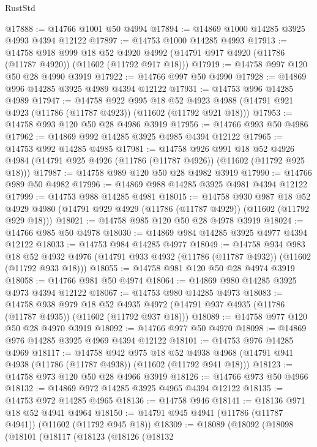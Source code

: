 \begin{lexlean}{RustStd}
\begin{coremodule}
@17888 := @14766 @1001 @50 @4994
@17894 := @14869 @1000 @14285 @3925 @4993 @4394 @12122
@17897 := @14753 @1000 @14285 @4993
@17913 := @14758
    @918
    @999
    @18
    @52
    @4920
    @4992
    (@14791 @917 @4920 (@11786 (@11787 @4920)) (@11602 (@11792 @917 @18)))
@17919 := @14758 @997 @120 @50 @28 @4990 @3919
@17922 := @14766 @997 @50 @4990
@17928 := @14869 @996 @14285 @3925 @4989 @4394 @12122
@17931 := @14753 @996 @14285 @4989
@17947 := @14758
    @922
    @995
    @18
    @52
    @4923
    @4988
    (@14791 @921 @4923 (@11786 (@11787 @4923)) (@11602 (@11792 @921 @18)))
@17953 := @14758 @993 @120 @50 @28 @4986 @3919
@17956 := @14766 @993 @50 @4986
@17962 := @14869 @992 @14285 @3925 @4985 @4394 @12122
@17965 := @14753 @992 @14285 @4985
@17981 := @14758
    @926
    @991
    @18
    @52
    @4926
    @4984
    (@14791 @925 @4926 (@11786 (@11787 @4926)) (@11602 (@11792 @925 @18)))
@17987 := @14758 @989 @120 @50 @28 @4982 @3919
@17990 := @14766 @989 @50 @4982
@17996 := @14869 @988 @14285 @3925 @4981 @4394 @12122
@17999 := @14753 @988 @14285 @4981
@18015 := @14758
    @930
    @987
    @18
    @52
    @4929
    @4980
    (@14791 @929 @4929 (@11786 (@11787 @4929)) (@11602 (@11792 @929 @18)))
@18021 := @14758 @985 @120 @50 @28 @4978 @3919
@18024 := @14766 @985 @50 @4978
@18030 := @14869 @984 @14285 @3925 @4977 @4394 @12122
@18033 := @14753 @984 @14285 @4977
@18049 := @14758
    @934
    @983
    @18
    @52
    @4932
    @4976
    (@14791 @933 @4932 (@11786 (@11787 @4932)) (@11602 (@11792 @933 @18)))
@18055 := @14758 @981 @120 @50 @28 @4974 @3919
@18058 := @14766 @981 @50 @4974
@18064 := @14869 @980 @14285 @3925 @4973 @4394 @12122
@18067 := @14753 @980 @14285 @4973
@18083 := @14758
    @938
    @979
    @18
    @52
    @4935
    @4972
    (@14791 @937 @4935 (@11786 (@11787 @4935)) (@11602 (@11792 @937 @18)))
@18089 := @14758 @977 @120 @50 @28 @4970 @3919
@18092 := @14766 @977 @50 @4970
@18098 := @14869 @976 @14285 @3925 @4969 @4394 @12122
@18101 := @14753 @976 @14285 @4969
@18117 := @14758
    @942
    @975
    @18
    @52
    @4938
    @4968
    (@14791 @941 @4938 (@11786 (@11787 @4938)) (@11602 (@11792 @941 @18)))
@18123 := @14758 @973 @120 @50 @28 @4966 @3919
@18126 := @14766 @973 @50 @4966
@18132 := @14869 @972 @14285 @3925 @4965 @4394 @12122
@18135 := @14753 @972 @14285 @4965
@18136 := @14758 @946
@18141 := @18136 @971 @18 @52 @4941 @4964
@18150 := @14791 @945 @4941 (@11786 (@11787 @4941)) (@11602 (@11792 @945 @18))
@18309 := @18089
    (@18092
      (@18098
        (@18101
          (@18117
            (@18123
              (@18126
                (@18132

\end{coremodule}
\end{lexlean}
